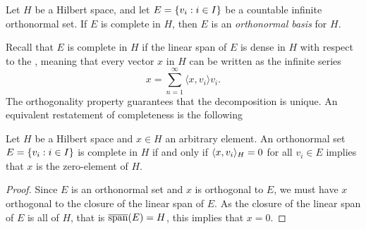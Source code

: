 \documentclass[../thesis.tex]{subfiles}
\begin{document}
\begin{definition}
    Let $H$ be a Hilbert space, and let $E = \{v_i : i \in I\}$ be a countable infinite orthonormal set. If $E$ is complete in $H$, then $E$ is an \emph{orthonormal basis} for $H$.
\end{definition}
Recall that $E$ is complete in $H$ if the linear span of $E$ is dense in $H$ with respect to the \GenNormH, meaning that every vector $x$ in $H$ can be written as the infinite series
\begin{equation}\label{eq:orthonorm_equiv}
    x= \sum_{n=1}^{\infty} \langle x, v_i \rangle v_i . %
\end{equation}
The orthogonality property guarantees that the decomposition is unique. %
An equivalent restatement of completeness is the following
\begin{lemma}\label{lem:ONB_alternative_def}
    Let $H$ be a Hilbert space and $x\in H$ an arbitrary element. An orthonormal set $E = \{v_i: i \in I\}$ is complete in $H$ if and only if $\langle x, v_i\rangle_{H} = 0$ for all $v_i\in E$ implies that $x$ is the zero-element of $H$.
\end{lemma}
\begin{proof}
    Since $E$ is an orthonormal set and $x$ is orthogonal to $E$, we must have $x$ orthogonal to the closure of the linear span of $E$. As the closure of the linear span of $E$ is all of $H$, that is $\overline{\operatorname{span}}(E) = H$, this implies that $x=0$. %
\end{proof}
\end{document}
